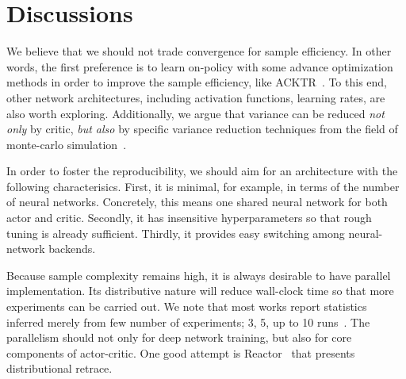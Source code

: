 \section{Discussions}





We believe that we should not trade convergence for sample efficiency.
In other words, the first preference is to learn on-policy with some advance optimization methods
in order to improve the sample efficiency, like ACKTR~\cite{NIPS2017_7112}.
To this end, other network architectures, including activation functions, learning rates, are also worth exploring.
Additionally, we argue that variance can be reduced \emph{not only} by critic,
\emph{but also} by specific variance reduction techniques from the field of monte-carlo simulation~\cite{citeulike:14544227}.

In order to foster the reproducibility, we should aim for an architecture with the following characterisics.
First, it is minimal, for example, in terms of the number of neural networks.
Concretely, this means one shared neural network for both actor and critic.
Secondly, it has insensitive hyperparameters so that rough tuning is already sufficient.
Thirdly, it provides easy switching among neural-network backends.

Because sample complexity remains high, it is always desirable to have parallel implementation.
Its distributive nature will reduce wall-clock time so that more experiments can be carried out.
We note that most works report statistics inferred merely from few number of experiments; 3, 5, up to 10 runs~\cite{henderson2017reinforcement}.
The parallelism should not only for deep network training, but also for core components of actor-critic.
One good attempt is Reactor~\cite{Gruslys2018} that presents distributional retrace.
